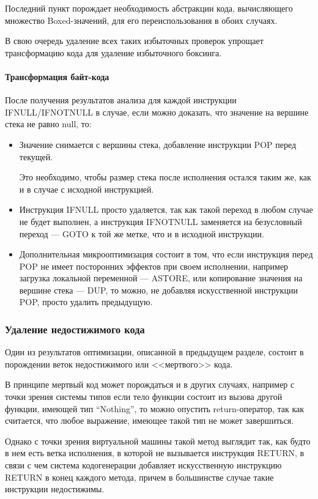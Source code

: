 Последний пункт порождает необходимость абстракции кода, вычисляющего множество Boxed-значений,
для его переиспользования в обоих случаях.

В свою очередь удаление всех таких избыточных проверок упрощает трансформацию кода для
удаление избыточного боксинга.

\paragraph{Трансформация байт-кода}
После получения результатов анализа для каждой инструкции IFNULL/IFNOTNULL в случае, если можно
доказать, что значение на вершине стека не равно null, то:
\begin{itemize}
    \item Значение снимается с вершины стека, добавление инструкции POP перед текущей.

    Это необходимо, чтобы размер стека после исполнения остался таким же, как и в случае
    с исходной инструкцией.

    \item Инструкция IFNULL просто удаляется, так как такой переход в любом случае не будет
    выполнен, а инструкция IFNOTNULL заменяется на безусловный переход --- GOTO к той же метке,
    что и в исходной инструкции.

    \item Дополнительная микрооптимизация состоит в том, что если инструкция перед POP не имеет
    посторонних эффектов при своем исполнении, например загрузка локальной переменной --- ASTORE,
    или копирование значения на вершине стека --- DUP, то можно, не добавляя искусственной инструкции
    POP, просто удалить предыдущую.
\end{itemize}

\subsubsection{Удаление недостижимого кода}
Один из результатов оптимизации, описанной в предыдущем разделе, состоит в порождении веток
недостижимого или <<мертвого>> кода.

В принципе мертвый код может порождаться и в других случаях, например с точки зрения системы типов
если тело функции состоит из вызова другой функции, имеющей тип ``Nothing'', то можно опустить
return-оператор, так как считается, что любое выражение, имеющее такой тип не может завершиться.

Однако с точки зрения виртуальной машины такой метод выглядит так, как будто в нем есть ветка
исполнения, в которой не вызывается инструкция RETURN, в связи с чем система кодогенерации
добавляет искусственную инструкцию RETURN в конец каждого метода, причем в большинстве
случае такие инструкции недостижимы.


